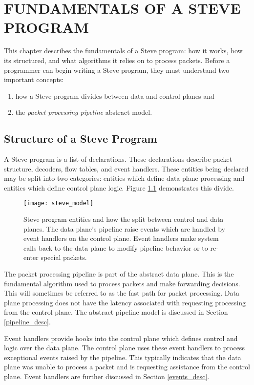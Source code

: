 \chapter{FUNDAMENTALS OF A STEVE PROGRAM} \label{ch:pipeline_model}

This chapter describes the fundamentals of a Steve program: how it works,
how its structured, and what algorithms it relies on to process packets.
Before a programmer can begin writing a Steve program, they must understand
two important concepts: 

\begin{enumerate}
\item how a Steve program divides between data and control planes and
\item the \emph{packet processing pipeline} abstract model.
\end{enumerate}

\section{Structure of a Steve Program}

A Steve program is a list of declarations. These declarations describe
packet structure, decoders, flow tables, and event handlers.
These entities being declared may be split into two categories:
entities which define data plane processing and
entities which define control plane logic. 
Figure \ref{fg:abstract_switch} demonstrates this divide.

\begin{figure}[ht]
\texttt{[image: steve\_model]}
\caption{Steve program entities and how the split between control and
data planes. The data plane's pipeline raise events which are handled by event 
handlers on the control plane. Event handlers make system calls back to the
data plane to modify pipeline behavior or to re-enter special packets.}
\label{fg:abstract_switch} 
\end{figure}

The packet processing pipeline is part of the abstract data plane.
This is the fundamental algorithm used to process packets and
make forwarding decisions.
This will sometimes be referred to as the fast path for packet
processing. 
Data plane processing does not have the latency associated
with requesting processing from the control plane. 
The abstract pipeline model is discussed in Section \ref{pipeline_desc}.

Event handlers provide hooks into the control plane which defines control
and logic over the data plane. The control plane uses these event handlers
to process exceptional events raised by the pipeline.
This typically indicates that the data plane was unable to process a packet
and is requesting assistance from the control plane.
Event handlers are further discussed in Section \ref{events_desc}.

